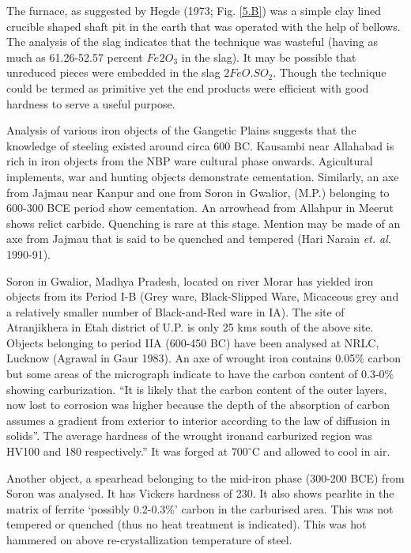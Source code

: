 The furnace, as suggested by Hegde (1973; Fig. \ref{5.B}) was a simple clay lined crucible shaped shaft pit in the earth that was operated with the help of bellows. The analysis of the slag indicates that the technique was wasteful (having as much as 61.26-52.57 percent $Fe_­­­­2O_3$ in the slag). It may be possible that unreduced pieces were embedded in the slag $2FeO. SO_2$. Though the technique could be termed as primitive yet the end products were efficient with good hardness to serve a useful purpose. 

Analysis of various iron objects of the Gangetic Plains suggests that the knowledge of steeling existed around circa 600 BC. Kausambi near Allahabad is rich in iron objects from the NBP ware cultural phase onwards. Agicultural implements, war and hunting objects demonstrate cementation. Similarly, an axe from Jajmau near Kanpur and one from Soron in Gwalior, (M.P.) belonging to 600-300 BCE period show cementation. An arrowhead from Allahpur in Meerut shows relict carbide. Quenching is rare at this stage. Mention may be made of an axe from Jajmau that is said to be quenched and tempered (Hari Narain {\it et. al.} 1990-91). 

Soron in Gwalior, Madhya Pradesh, located on river Morar has yielded iron objects from its Period I-B (Grey ware, Black-Slipped Ware, Micaceous grey and a relatively smaller number of Black-and-Red ware in IA). The site of Atranjikhera in Etah district of U.P. is only 25 kms south of the above site. Objects belonging to period IIA (600-450 BC) have been analysed at NRLC, Lucknow (Agrawal in Gaur 1983). An axe of wrought iron contains 0.05\% carbon but some areas of the micrograph indicate to have the carbon content of 0.3-0\% showing carburization. “It is likely that the carbon content of the outer layers, now lost to corrosion was higher because the depth of the absorption of carbon assumes a gradient from exterior to interior according to the law of diffusion in solids”. The average hardness of the wrought iron\newpage and carburized region was HV100 and 180 respectively.” It was forged at $700^\circ$C and allowed to cool in air. 


Another object, a spearhead belonging to the mid-iron phase (300-200 BCE) from Soron was analysed. It has Vickers hardness of 230. It also shows pearlite in the matrix of ferrite ‘possibly 0.2-0.3\%’ carbon in the carburised area. This was not tempered or quenched (thus no heat treatment is indicated). This was hot hammered on above re-crystallization temperature of steel. 

